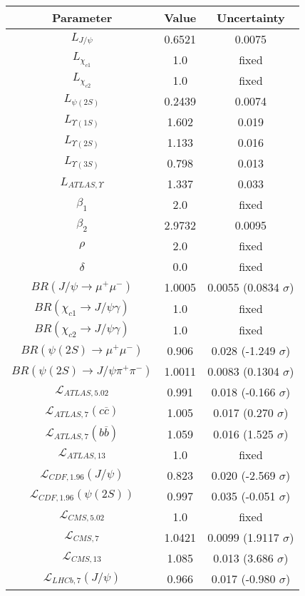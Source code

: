 \begin{table}[h!]
\centering
\begin{tabular}{c|c|c}
Parameter & Value & Uncertainty \\
\hline
$L_{J/\psi}$ & 0.6521 & 0.0075 \\
$L_{\chi_{c1}}$ & 1.0 & fixed \\
$L_{\chi_{c2}}$ & 1.0 & fixed \\
$L_{\psi(2S)}$ & 0.2439 & 0.0074 \\
$L_{\Upsilon(1S)}$ & 1.602 & 0.019 \\
$L_{\Upsilon(2S)}$ & 1.133 & 0.016 \\
$L_{\Upsilon(3S)}$ & 0.798 & 0.013 \\
$L_{ATLAS,\Upsilon}$ & 1.337 & 0.033 \\
$\beta_1$ & 2.0 & fixed \\
$\beta_2$ & 2.9732 & 0.0095 \\
$\rho$ & 2.0 & fixed \\
$\delta$ & 0.0 & fixed \\
$BR(J/\psi\rightarrow\mu^+\mu^-)$ & 1.0005 & 0.0055 (0.0834 $\sigma$) \\
$BR(\chi_{c1}\rightarrow J/\psi\gamma)$ & 1.0 & fixed \\
$BR(\chi_{c2}\rightarrow J/\psi\gamma)$ & 1.0 & fixed \\
$BR(\psi(2S)\rightarrow\mu^+\mu^-)$ & 0.906 & 0.028 (-1.249 $\sigma$) \\
$BR(\psi(2S)\rightarrow J/\psi\pi^+\pi^-)$ & 1.0011 & 0.0083 (0.1304 $\sigma$) \\
$\mathcal L_{ATLAS,5.02}$ & 0.991 & 0.018 (-0.166 $\sigma$) \\
$\mathcal L_{ATLAS,7}(c\overline c)$ & 1.005 & 0.017 (0.270 $\sigma$) \\
$\mathcal L_{ATLAS,7}(b\overline b)$ & 1.059 & 0.016 (1.525 $\sigma$) \\
$\mathcal L_{ATLAS,13}$ & 1.0 & fixed \\
$\mathcal L_{CDF,1.96}(J/\psi)$ & 0.823 & 0.020 (-2.569 $\sigma$) \\
$\mathcal L_{CDF,1.96}(\psi(2S))$ & 0.997 & 0.035 (-0.051 $\sigma$) \\
$\mathcal L_{CMS,5.02}$ & 1.0 & fixed \\
$\mathcal L_{CMS,7}$ & 1.0421 & 0.0099 (1.9117 $\sigma$) \\
$\mathcal L_{CMS,13}$ & 1.085 & 0.013 (3.686 $\sigma$) \\
$\mathcal L_{LHCb,7}(J/\psi)$ & 0.966 & 0.017 (-0.980 $\sigma$) \\

\end{tabular}
\end{table}
